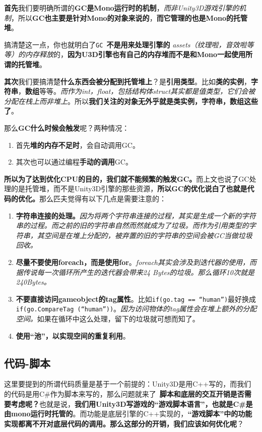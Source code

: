 \documentclass[UTF8,a4paper,12pt]{ctexart}
\begin{document}
	  		\textbf{首先}我们要明确所谓的\textbf{GC是Mono运行时的机制}，\textit{而非Unity3D游戏引擎的机制}，所以\textbf{GC也主要是针对Mono的对象来说的}，\textbf{而它管理的也是Mono的托管堆}。
	  		
	  		搞清楚这一点，你也就明白了\verb|GC |\textbf{不是用来处理引擎的}\textit{ assets（纹理啦，音效啦等等）的内存释放}的，\textbf{因为U3D引擎也有自己的内存堆而不是和Mono一起使用所谓的托管堆}。
	  		
	  		\textbf{其次}我们要搞清楚\textbf{什么东西会被分配到托管堆上}？是\textbf{引用类型}。比如\textbf{类的实例}，\textbf{字符串}，\textbf{数组}等等。\textit{而作为int，float，包括结构体struct其实都是值类型，它们会被分配在栈上而非堆上}。所以\textbf{我们关注的对象无外乎就是类实例，字符串，数组这些了}。
	  		
	  		那么\textbf{GC什么时候会触发}呢？两种情况：
	  			\begin{enumerate}[itemindent = 2em]
	  				\item 首先\textbf{堆的内存不足时}，会自动调用GC。
	  				\item 其次也可以通过编程\textbf{手动的调用}GC。
	  			\end{enumerate}
	  		
	  		
	  		\textbf{所以为了达到优化CPU的目的，我们就不能频繁的触发GC。}而上文也说了GC处理的是托管堆，而不是Unity3D引擎的那些资源，\textbf{所以GC的优化说白了也就是代码的优化。}那么匹夫觉得有以下几点是需要注意的：
	  			\begin{enumerate}[itemindent = 2em]
	  				\item \textbf{字符串连接的处理。}\textit{因为将两个字符串连接的过程，其实是生成一个新的字符串的过程。而之前的旧的字符串自然而然就成为了垃圾。而作为引用类型的字符串，其空间是在堆上分配的，被弃置的旧的字符串的空间会被GC当做垃圾回收。}
	  				\item \textbf{尽量不要使用foreach，而是使用for}。\textit{foreach其实会涉及到迭代器的使用，而据传说每一次循环所产生的迭代器会带来24 Bytes的垃圾。那么循环10次就是240Bytes。}
	  				\item \textbf{不要直接访问gameobject的tag属性}。比如\verb|if(go.tag == “human”)|最好换成\verb|if(go.CompareTag (“human”))|。\textit{因为访问物体的tag属性会在堆上额外的分配空间。}如果在循环中这么处理，留下的垃圾就可想而知了。
	  				\item \textbf{使用“池”，以实现空间的重复利用}。
	  			\end{enumerate}
	  		
	  		
	  	\subsection{代码-脚本}
  			这里要提到的所谓代码质量是基于一个前提的：Unity3D是用C++写的，而我们的代码是用C\#作为脚本来写的，那么问题就来了~\textbf{脚本和底层的交互开销是否需要考虑呢？}也就是说，\textbf{我们用Unity3D写游戏的“游戏脚本语言”，也就是C\#是由mono运行时托管的}。而功能是底层引擎的C++实现的，\textbf{“游戏脚本”中的功能实现都离不开对底层代码的调用。那么这部分的开销，我们应该如何优化呢}？
  			
\end{document}

